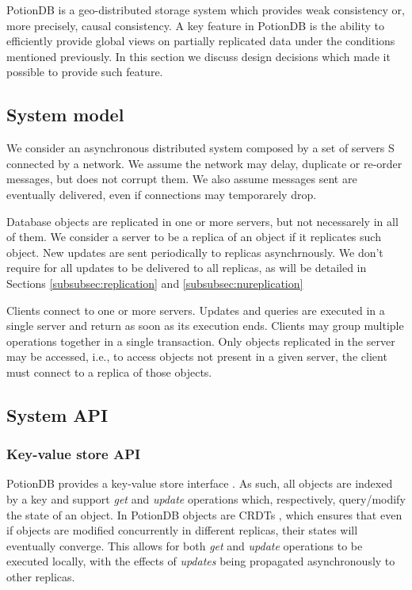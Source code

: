 \documentclass{vldb}
\begin{document}
PotionDB is a geo-distributed storage system which provides weak consistency or, more precisely, causal consistency.
A key feature in PotionDB is the ability to efficiently provide global views on partially replicated data under the conditions mentioned previously.
In this section we discuss design decisions which made it possible to provide such feature.

\subsection{System model}

We consider an asynchronous distributed system composed by a set of servers S connected by a network. 
We assume the network may delay, duplicate or re-order messages, but does not corrupt them. 
We also assume messages sent are eventually delivered, even if connections may temporarely drop.

Database objects are replicated in one or more servers, but not necessarely in all of them.  
We consider a server to be a replica of an object if it replicates such object. 
New updates are sent periodically to replicas asynchrnously. 
We don't require for all updates to be delivered to all replicas, as will be detailed in Sections \ref{subsubsec:replication} and \ref{subsubsec:nureplication}

Clients connect to one or more servers. 
Updates and queries are executed in a single server and return as soon as its execution ends.
Clients may group multiple operations together in a single transaction.
Only objects replicated in the server may be accessed, i.e., to access objects not present in a given server, the client must connect to a replica of those objects.

\subsection{System API}

\subsubsection{Key-value store API}

PotionDB provides a key-value store interface \cite{???}.
As such, all objects are indexed by a key and support \emph{get} and \emph{update} operations which, respectively, query/modify the state of an object.
In PotionDB objects are CRDTs \cite{???}, which ensures that even if objects are modified concurrently in different replicas, their states will eventually converge.
This allows for both \emph{get} and \emph{update} operations to be executed locally, with the effects of \emph{updates} being propagated asynchronously to other replicas.
\end{document}
